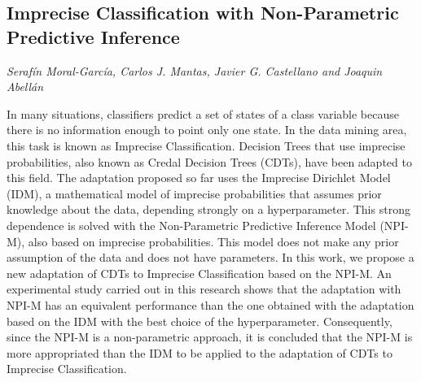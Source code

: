 \documentclass[../booklet.tex]{subfiles}
\begin{document}
\subsection[Imprecise Classification with Non-Parametric Predictive Inference. {\it Serafín Moral-García, Carlos J. Mantas, Javier G. Castellano and Joaquin Abellán}]{Imprecise Classification with Non-Parametric Predictive Inference}
   

\begin{center}
  {\it Serafín Moral-García, Carlos J. Mantas, Javier G. Castellano and Joaquin Abellán}
\end{center}

\vskip 0.8cm



In many situations, classifiers predict a set of states of a class variable because there is no information enough to point only one state. In the data mining area, this task is known as Imprecise Classification. Decision Trees that use imprecise probabilities, also known as Credal Decision Trees (CDTs), have been adapted to this field. The adaptation proposed so far uses the Imprecise Dirichlet Model (IDM), a mathematical model of imprecise probabilities that assumes prior knowledge about the data, depending strongly on a hyperparameter. This strong dependence is solved with the Non-Parametric Predictive Inference Model (NPI-M), also based on imprecise probabilities. This model does not make any prior assumption of the data and does not have parameters. In this work, we propose a new adaptation of CDTs to Imprecise Classification based on the NPI-M. An experimental study carried out in this research shows that the adaptation with NPI-M has an equivalent performance than the one obtained with the adaptation based on the IDM with the best choice of the hyperparameter.  Consequently, since the NPI-M is a non-parametric approach, it is concluded that the NPI-M is more appropriated than the IDM to be applied to the adaptation of CDTs to Imprecise Classification. 

\end{document}
